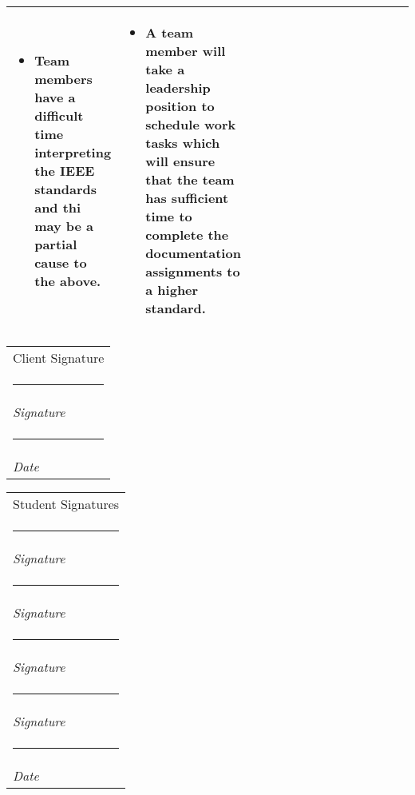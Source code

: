 \documentclass[letterpaper,10pt,titlepage,draftclsnofoot,onecolumn,onesided] {IEEEtran}
\makeatletter
\newcommand{\namesigdate}[2][4cm]{%
  \begin{tabular}{@{}p{#1}@{}}
    #2 \\[2\normalbaselineskip] \hrule \\[0pt]
    {\small \textit{Signature}} \\[2\normalbaselineskip] \hrule \\[0pt]
    {\small \textit{Date}}
  \end{tabular}
}
\newcommand{\studentnamesigdate}[2][4cm]{%
  \begin{tabular}{@{}p{#1}@{}}
    #2 \\[2\normalbaselineskip] \hrule \\[0pt]
    {\small \textit{Signature}} \\[2\normalbaselineskip] \hrule \\[0pt]
    {\small \textit{Signature}} \\[2\normalbaselineskip] \hrule \\[0pt]
    {\small \textit{Signature}} \\[2\normalbaselineskip] \hrule \\[0pt]
    {\small \textit{Signature}} \\[2\normalbaselineskip] \hrule \\[0pt]
    {\small \textit{Date}}
  \end{tabular}
}
\makeatother
\begin{document}
\begin{center}
\begin{tabular}{ |  p{0.25\linewidth}  |  p{0.25\linewidth}  | p{0.25\linewidth} | p{0.25\linewidth} |}
\begin{itemize}
				\item Team members have a difficult time interpreting the IEEE standards and thi may be a partial cause to the above.
			\end{itemize}
		&
			\begin{itemize}
				\item A team member will take a leadership position to schedule work tasks which will ensure that the team has sufficient time to complete the documentation assignments to a higher standard. 
			\end{itemize} 
		\\ \hline
		\end{tabular}
	\end{center}


\pagebreak


\pagebreak

\namesigdate{Client Signature} \hfill 
\studentnamesigdate[4cm]{Student Signatures}
\end{document}
